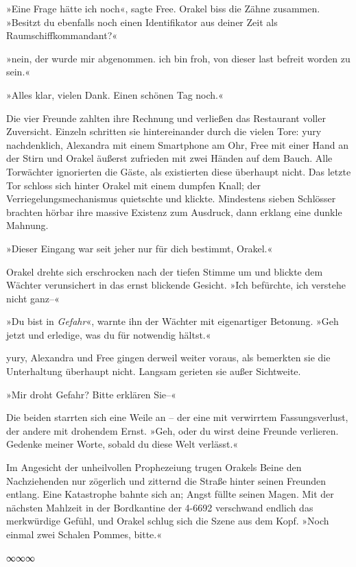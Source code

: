 »Eine Frage hätte ich noch«, sagte Free. Orakel biss die Zähne zusammen. »Besitzt du ebenfalls noch einen Identifikator aus deiner Zeit als Raumschiffkommandant?«

»nein, der wurde mir abgenommen. ich bin froh, von dieser last befreit worden zu sein.«

»Alles klar, vielen Dank. Einen schönen Tag noch.«

Die vier Freunde zahlten ihre Rechnung und verließen das Restaurant voller Zuversicht. Einzeln schritten sie hintereinander durch die vielen Tore: yury nachdenklich, Alexandra mit einem Smartphone am Ohr, Free mit einer Hand an der Stirn und Orakel äußerst zufrieden mit zwei Händen auf dem Bauch. Alle Torwächter ignorierten die Gäste, als existierten diese überhaupt nicht. Das letzte Tor schloss sich hinter Orakel mit einem dumpfen Knall; der Verriegelungsmechanismus quietschte und klickte. Mindestens sieben Schlösser brachten hörbar ihre massive Existenz zum Ausdruck, dann erklang eine dunkle Mahnung.

»Dieser Eingang war seit jeher nur für dich bestimmt, Orakel.«

Orakel drehte sich erschrocken nach der tiefen Stimme um und blickte dem Wächter verunsichert in das ernst blickende Gesicht. »Ich befürchte, ich verstehe nicht ganz–«

»Du bist in \emph{Gefahr}«, warnte ihn der Wächter mit eigenartiger Betonung. »Geh jetzt und erledige, was du für notwendig hältst.«

yury, Alexandra und Free gingen derweil weiter voraus, als bemerkten sie die Unterhaltung überhaupt nicht. Langsam gerieten sie außer Sichtweite.

»Mir droht Gefahr? Bitte erklären Sie–«

 Die beiden starrten sich eine Weile an – der eine mit verwirrtem Fassungsverlust, der andere mit drohendem Ernst. »Geh, oder du wirst deine Freunde verlieren. Gedenke meiner Worte, sobald du diese Welt verlässt.«

Im Angesicht der unheilvollen Prophezeiung trugen Orakels Beine den Nachziehenden nur zögerlich und zitternd die Straße hinter seinen Freunden entlang. Eine Katastrophe bahnte sich an; Angst füllte seinen Magen. Mit der nächsten Mahlzeit in der Bordkantine der 4-6692 verschwand endlich das merkwürdige Gefühl, und Orakel schlug sich die Szene aus dem Kopf. »Noch einmal zwei Schalen Pommes, bitte.«

\begin{center}
∞∞∞
\end{center}

